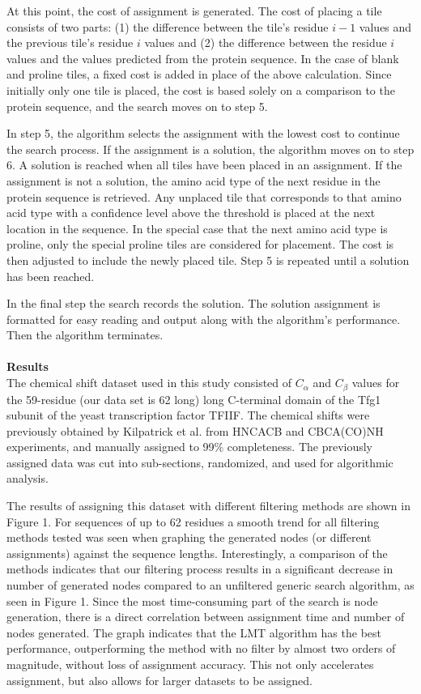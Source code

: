 \documentclass{article}
\begin{document}
At this point, the cost of assignment is generated. The cost of placing a tile consists of two parts: (1) the difference between the tile’s residue $i-1$  values and the previous tile’s residue $i$ values and (2) the difference between the residue $i$ values and the values predicted from the protein sequence. In the case of blank and proline tiles, a fixed cost is added in place of the above calculation. Since initially only one tile is placed, the cost is based solely on a comparison to the protein sequence, and the search moves on to step 5.

In step 5, the algorithm selects the assignment with the lowest cost to continue the search process. If the assignment is a solution, the algorithm moves on to step 6.  A solution is reached when all tiles have been placed in an assignment. If the assignment is not a solution, the amino acid type of the next residue in the protein sequence is retrieved. Any unplaced tile that corresponds to that amino acid type with a confidence level above the threshold is placed at the next location in the sequence. In the special case that the next amino acid type is proline, only the special proline tiles are considered for placement. The cost is then adjusted to include the newly placed tile. Step 5 is repeated until a solution has been reached. 

In the final step the search records the solution. The solution assignment is formatted for easy reading and output along with the algorithm’s performance. Then the algorithm terminates. 
\\\\
\noindent\textbf {Results}\\
The chemical shift dataset used in this study consisted of $C_\alpha$ and $C_\beta$ values for the 59-residue (our data set is 62 long) long C-terminal domain of the Tfg1 subunit of the yeast transcription factor TFIIF. The chemical shifts were previously obtained by Kilpatrick et al. from HNCACB and CBCA(CO)NH experiments, and manually assigned to 99\% completeness. The previously assigned data was cut into sub-sections, randomized, and used for algorithmic analysis. 

The results of assigning this dataset with different filtering methods are shown in Figure 1. For sequences of up to 62 residues a smooth trend for all filtering methods tested was seen when graphing the generated nodes (or different assignments) against the sequence lengths. Interestingly, a comparison of the methods indicates that our filtering process results in a significant decrease in number of generated nodes compared to an unfiltered generic search algorithm, as seen in Figure 1. Since the most time-consuming part of the search is node generation, there is a direct correlation between assignment time and number of nodes generated. The graph indicates that the LMT algorithm has the best performance, outperforming the method with no filter by almost two orders of magnitude, without loss of assignment accuracy. This not only accelerates assignment, but also allows for larger datasets to be assigned. 
\end{document}
